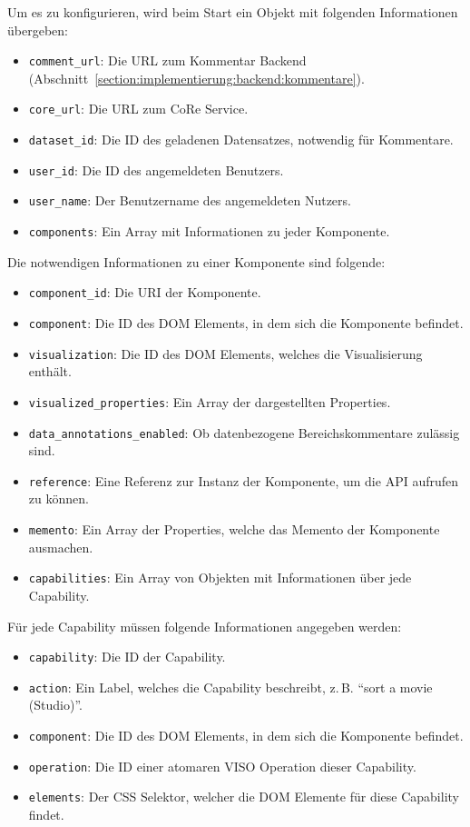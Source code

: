 \documentclass[
	headsepline,
	footsepline,
	fontsize=12pt,
	bibliography=totoc
]{scrbook}
\begin{document}
Um es zu konfigurieren, wird beim Start ein Objekt mit folgenden Informationen übergeben:

\begin{itemize}
	\item \texttt{comment\_url}: Die URL zum Kommentar Backend (Abschnitt~\ref{section:implementierung:backend:kommentare}).
	\item \texttt{core\_url}: Die URL zum CoRe Service.
	\item \texttt{dataset\_id}: Die ID des geladenen Datensatzes, notwendig für Kommentare.
	\item \texttt{user\_id}: Die ID des angemeldeten Benutzers.
	\item \texttt{user\_name}: Der Benutzername des angemeldeten Nutzers.
	\item \texttt{components}: Ein Array mit Informationen zu jeder Komponente.
\end{itemize}

Die notwendigen Informationen zu einer Komponente sind folgende:

\begin{itemize}
	\item \texttt{component\_id}: Die URI der Komponente.
	\item \texttt{component}: Die ID des DOM Elements, in dem sich die Komponente befindet.
	\item \texttt{visualization}: Die ID des DOM Elements, welches die Visualisierung enthält.
	\item \texttt{visualized\_properties}: Ein Array der dargestellten Properties.
	\item \texttt{data\_annotations\_enabled}: Ob datenbezogene Bereichskommentare zulässig sind.
	\item \texttt{reference}: Eine Referenz zur Instanz der Komponente, um die API aufrufen zu können.
	\item \texttt{memento}: Ein Array der Properties, welche das Memento der Komponente ausmachen.
	\item \texttt{capabilities}: Ein Array von Objekten mit Informationen über jede Capability.
\end{itemize}

Für jede Capability müssen folgende Informationen angegeben werden:

\begin{itemize}
	\item \texttt{capability}: Die ID der Capability.
	\item \texttt{action}: Ein Label, welches die Capability beschreibt, z.\,B. \enquote{sort a movie (Studio)}.
	\item \texttt{component}: Die ID des DOM Elements, in dem sich die Komponente befindet.
	\item \texttt{operation}: Die ID einer atomaren VISO Operation dieser Capability.
	\item \texttt{elements}: Der CSS Selektor, welcher die DOM Elemente für diese Capability findet.
\end{itemize}
\end{document}
